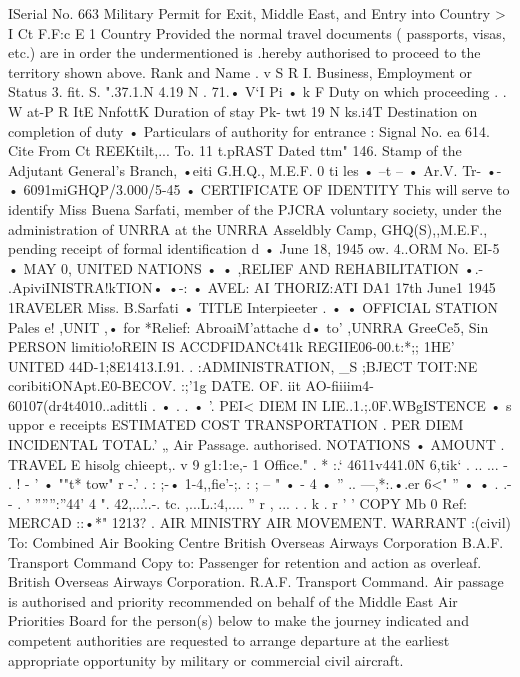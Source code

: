 
ISerial 
No.
663 
Military Permit for Exit, Middle East, and Entry into 
Country > 
I Ct F.F:c E 1 Country 
Provided the normal travel documents ( passports, visas, etc.)
are in order the undermentioned is .hereby 
authorised to proceed to the territory shown above.
Rank and Name .
v S R I. 
Business, Employment or Status 3. fit.
S.
".37.1.N 4.19 N .
71.• V‘I Pi • k F 
Duty on which proceeding .
.
W at-P R ItE NnfottK 
Duration of stay Pk- twt 19 N ks.i4T 
Destination on completion of duty 
• 
Particulars of authority for entrance : Signal No.
ea 614.
Cite From Ct REEKtilt,... To.
11 t.pRAST Dated ttm" 146.
Stamp of the Adjutant General's 
Branch, 
•eiti 
G.H.Q., M.E.F.
0 ti les • 
--t 
-- • Ar.V.
Tr- 
•-• 
6091miGHQP/3.000/5-45 • 
CERTIFICATE OF IDENTITY 
This will serve to identify Miss Buena Sarfati, member of 
the PJCRA voluntary society, under the administration of 
UNRRA at the UNRRA Asseldbly Camp, GHQ(S),,M.E.F., pending 
receipt of formal identification d 
• 
June 18, 1945 
ow.
4..ORM No.
EI-5 
• MAY 0, 
UNITED NATIONS • • 
,RELIEF AND REHABILITATION •.- 
.ApiviINISTRA!kTION• •-: • 
AVEL: AI THORIZ:ATI 
DA1 17th June1 1945 
1RAVELER 
Miss.
B.Sarfati 
• TITLE Interpieeter 
.
• 
• OFFICIAL STATION Pales e!
,UNIT ,• for *Relief: AbroaiM'attache d• 
to' ,UNRRA GreeCe5, Sin 
PERSON 
limitio!oREIN IS ACCDFIDANCt41k 
REGIIE06-00.t:*;; 
1HE' UNITED 
44D-1;8E1413.I.91.
.
:ADMINISTRATION, _S ;BJECT TOIT:NE 
coribitiONApt.E0-BECOV.
:;'1g DATE.
OF.
iit AO-fiiiim4- 60107(dr4t4010..adittli 
.
• 
.
.
• 
'.
PEI< DIEM IN LIE..1.;.0F.WBgISTENCE 
• s uppor e receipts 
ESTIMATED COST 
TRANSPORTATION 
.
PER DIEM 
INCIDENTAL 
TOTAL.'
„ 
Air Passage.
authorised.
NOTATIONS • AMOUNT .
TRAVEL E 
hisolg 
chieept,.
v 9 
g1:1:e,- 1 Office."
.
* :.‘ 
4611v441.0N 6,tik‘ 
.
.. 
... 
- .
!
- ' • ""t* tow" r 
-.'
.
: ;-• 1-4,,fie'-;.
: ; 
-- " • - 4 • '' .. ---,*:.•.er 6<" '' 
• 
• .
.- 
- 
. '
'''''':''44' 4 ".
42,...'..-.
tc.
,...L.:4,.... '' r , ... .
.
k .
r ' ' 
COPY 
Mb 0 
Ref: MERCAD 
::•*" 
1213?
.
AIR MINISTRY AIR MOVEMENT.
WARRANT :(civil) 
To: Combined Air Booking Centre 
British Overseas Airways Corporation 
B.A.F.
Transport Command 
Copy to: Passenger for retention and action as overleaf.
British Overseas Airways Corporation.
R.A.F.
Transport Command.
Air passage is authorised and priority recommended on behalf of the Middle East Air Priorities 
Board for the person(s) below to make the journey indicated and competent authorities are requested to 
arrange departure at the earliest appropriate opportunity by military or commercial civil aircraft.
